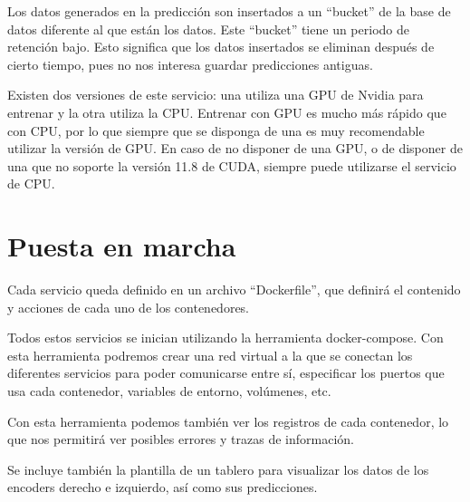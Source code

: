 Los datos generados en la predicción son insertados a un ``bucket'' de la base de datos diferente al que están los datos.
Este ``bucket'' tiene un periodo de retención bajo. Esto significa que los datos insertados se eliminan después 
de cierto tiempo, pues no nos interesa guardar predicciones antiguas.

Existen dos versiones de este servicio: una utiliza una GPU de Nvidia para entrenar y la otra utiliza la CPU. Entrenar con
GPU es mucho más rápido que con CPU, por lo que siempre que se disponga de una es muy recomendable utilizar la versión de GPU.
En caso de no disponer de una GPU, o de disponer de una que no soporte la versión 11.8 de CUDA, siempre puede utilizarse el 
servicio de CPU.


\section{Puesta en marcha}

Cada servicio queda definido en un archivo ``Dockerfile'', que definirá el contenido y acciones de cada uno de los 
contenedores.

Todos estos servicios se inician utilizando la herramienta docker-compose. Con esta herramienta podremos crear
una red virtual a la que se conectan los diferentes servicios para poder comunicarse entre sí, especificar los
puertos que usa cada contenedor, variables de entorno, volúmenes, etc.

Con esta herramienta podemos también ver los registros de cada contenedor, lo que nos permitirá ver posibles errores 
y trazas de información.

Se incluye también la plantilla de un tablero para visualizar los datos de los encoders derecho e izquierdo, así 
como sus predicciones.